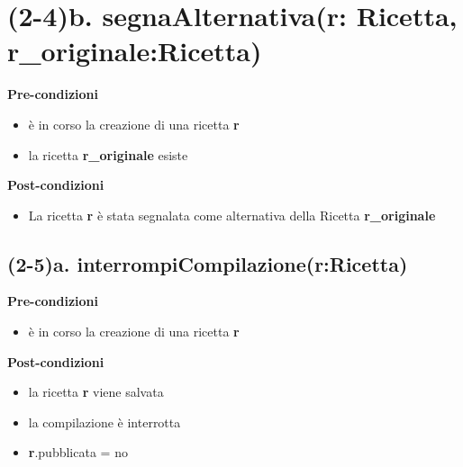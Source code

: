 \documentclass[12pt]{extarticle}
\begin{document}
\section*{(2-4)b. segnaAlternativa(r: Ricetta, r\_originale:Ricetta)}

\textbf{Pre-condizioni}
\begin{itemize}
  \item è in corso la creazione di una ricetta  \textbf{r}
  \item la ricetta \textbf{r\_originale} esiste
\end{itemize}
\textbf{Post-condizioni}
\begin{itemize}
  \item La ricetta  \textbf{r} è stata segnalata come alternativa della Ricetta  \textbf{r\_originale}
\end{itemize}

\subsection*{(2-5)a. interrompiCompilazione(r:Ricetta)}

\textbf{Pre-condizioni}
\begin{itemize}
  \item è in corso la creazione di una ricetta  \textbf{r}
\end{itemize}
\textbf{Post-condizioni}
\begin{itemize}
  \item la ricetta  \textbf{r} viene salvata
  \item la compilazione è interrotta
  \item \textbf{r}.pubblicata = no
\end{itemize}
\end{document}
